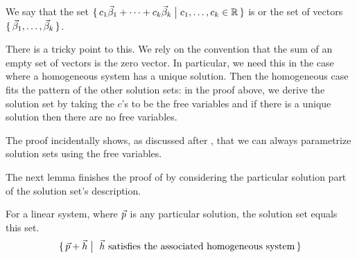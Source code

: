We say that the set
$\mbox{$\{\,c_1\vec{\beta}_1+\cdots+c_k\vec{\beta}_k \bigm| c_1,\ldots,c_k\in\mathbb{R}\,\}$}$
is  or  the set of vectors
\( \mbox{$\{\,\smash{\vec{\beta}_1},\ldots,\smash{\vec{\beta}_k}\,\}$} \).

There is a tricky point to this.
We rely on the convention that the sum of an empty set of vectors is the 
zero vector.
In particular, we need this in the case where 
a homogeneous system has a unique solution.
Then the homogeneous case 
fits the pattern of the other solution sets: in the proof above,
we derive the solution set by taking the \( c \)'s to be the free variables
and if there is a unique solution then there are no free variables.

The proof incidentally shows, 
as discussed after , that 
we can always parametrize solution sets
using the free variables.

The next lemma finishes the proof of  
by considering the particular solution part of the 
solution set's description.

\begin{lemma}  \label{th:GenEqPartHomo}
For a linear system, where $\vec{p}\/$ is any particular solution,
the solution set equals this set.
\begin{equation*}
  \mbox{$\{\,\vec{p}+\vec{h} \bigm| \text{ \( \vec{h} \) satisfies the
                                associated homogeneous system}     \,\}$}
\end{equation*}
\end{lemma}

